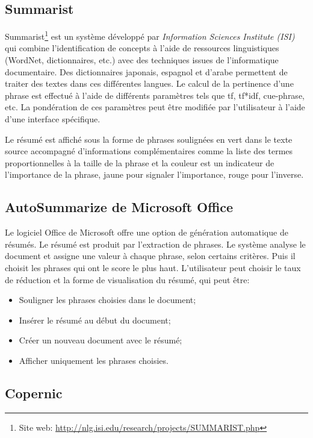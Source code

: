 \documentclass[a4paper,12pt,oneside]{../use/ESIthesis}
\begin{document}
\subsection{Summarist}

Summarist\footnote{Site web: \url{http://nlg.isi.edu/research/projects/SUMMARIST.php}} est un système développé par \textit{Information Sciences Institute (ISI)} qui combine l'identification de concepts à l'aide de ressources linguistiques (WordNet, dictionnaires, etc.) avec des techniques issues de l'informatique documentaire. 
Des dictionnaires japonais, espagnol et d'arabe permettent de traiter des textes dans ces différentes langues. 
Le calcul de la pertinence d'une phrase est effectué à l'aide de différents paramètres tels que tf, tf*idf, cue-phrase, etc. 
La pondération de ces paramètres peut être modifiée par l'utilisateur à l'aide d'une interface spécifique.

Le résumé est affiché sous la forme de phrases soulignées en vert dans le texte source accompagné d'informations complémentaires comme la liste des termes proportionnelles à la taille de la phrase et la couleur est un indicateur de l'importance de la phrase, jaune pour signaler l'importance, rouge pour l'inverse.

\subsection{AutoSummarize de Microsoft Office}

Le logiciel Office de Microsoft offre une option de génération automatique de résumés. 
Le résumé est produit par l'extraction de phrases. 
Le système analyse le document et assigne une valeur à chaque phrase, selon certains critères. 
Puis il choisit les phrases qui ont le score le plus haut. 
L'utilisateur peut choisir le taux de réduction et la forme de visualisation du résumé, qui peut être:
\begin{itemize}
\item Souligner les phrases choisies dans le document;
\item Insérer le résumé au début du document;
\item Créer un nouveau document avec le résumé;
\item Afficher uniquement les phrases choisies.
\end{itemize}

\subsection{Copernic}
\end{document}
